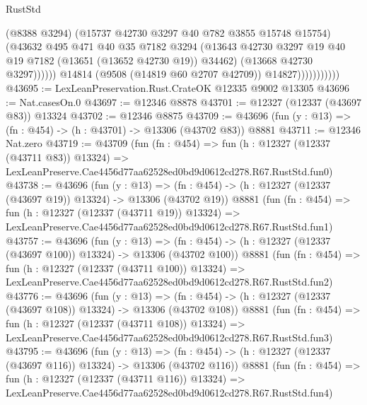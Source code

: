 \begin{lexlean}{RustStd}
\begin{coremodule}
                                  (@8388 @3294)
                                  (@15737 @42730 @3297 @40 @782 @3855 @15748 @15754)
                                  (@43632
                                    @495
                                    @471
                                    @40
                                    @35
                                    @7182
                                    @3294
                                    (@13643
                                      @42730
                                      @3297
                                      @19
                                      @40
                                      @19
                                      @7182
                                      (@13651 (@13652 @42730 @19))
                                      @34462)
                                    (@13668 @42730 @3297))))))
                          @14814
                          (@9508 (@14819 @60 @2707 @42709))
                          @14827)))))))))))
@43695 := LexLeanPreservation.Rust.CrateOK @12335 @9002 @13305
@43696 := Nat.casesOn.{0}
@43697 := @12346 @8878
@43701 := @12327 (@12337 (@43697 @83)) @13324
@43702 := @12346 @8875
@43709 := @43696 (fun (y : @13) => (fn : @454) -> (h : @43701) -> @13306 (@43702 @83)) @8881
@43711 := @12346 Nat.zero
@43719 := @43709
    (fun (fn : @454) =>
    fun (h : @12327 (@12337 (@43711 @83)) @13324) =>
    LexLeanPreserve.Cae4456d77aa62528ed0bd9d0612cd278.R67.RustStd.fun0)
@43738 := @43696
    (fun (y : @13) =>
    (fn : @454) -> (h : @12327 (@12337 (@43697 @19)) @13324) -> @13306 (@43702 @19))
    @8881
    (fun (fn : @454) =>
    fun (h : @12327 (@12337 (@43711 @19)) @13324) =>
    LexLeanPreserve.Cae4456d77aa62528ed0bd9d0612cd278.R67.RustStd.fun1)
@43757 := @43696
    (fun (y : @13) =>
    (fn : @454) -> (h : @12327 (@12337 (@43697 @100)) @13324) -> @13306 (@43702 @100))
    @8881
    (fun (fn : @454) =>
    fun (h : @12327 (@12337 (@43711 @100)) @13324) =>
    LexLeanPreserve.Cae4456d77aa62528ed0bd9d0612cd278.R67.RustStd.fun2)
@43776 := @43696
    (fun (y : @13) =>
    (fn : @454) -> (h : @12327 (@12337 (@43697 @108)) @13324) -> @13306 (@43702 @108))
    @8881
    (fun (fn : @454) =>
    fun (h : @12327 (@12337 (@43711 @108)) @13324) =>
    LexLeanPreserve.Cae4456d77aa62528ed0bd9d0612cd278.R67.RustStd.fun3)
@43795 := @43696
    (fun (y : @13) =>
    (fn : @454) -> (h : @12327 (@12337 (@43697 @116)) @13324) -> @13306 (@43702 @116))
    @8881
    (fun (fn : @454) =>
    fun (h : @12327 (@12337 (@43711 @116)) @13324) =>
    LexLeanPreserve.Cae4456d77aa62528ed0bd9d0612cd278.R67.RustStd.fun4)

\end{coremodule}
\end{lexlean}
